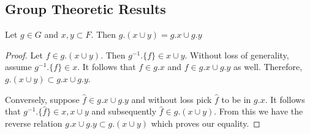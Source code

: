 \subsection{Group Theoretic Results}







\begin{mylem}
Let $g \in G$ and $x,y \subset F$. Then $g.(x\cup y) = g.x \cup g.y$
\end{mylem}
\begin{proof}
Let $f \in g.(x\cup y)$. Then $g^{-1}.\{f\} \in x \cup y$. Without loss of generality, assume $g^{-1}.\{f\} \in x$. It follows that $f \in g.x$ and $f \in g.x \cup g.y$ as well. Therefore, $g.(x\cup y) \subset g.x \cup g.y$.

Conversely, suppose $\hat{f} \in g.x \cup g.y$ and without loss pick $\hat{f}$ to be in $g.x$. It follows that $g^{-1}.\{\hat{f}\} \in x, x \cup y$ and subsequently $\hat{f} \in g.(x \cup y)$. From this we have the reverse relation $g.x \cup g.y \subset g.(x\cup y)$ which proves our equality.
\end{proof}





